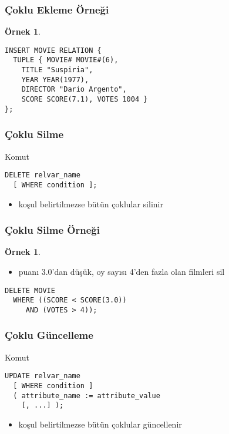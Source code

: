 \documentclass[dvipsnames]{beamer}
\theoremstyle{definition}
\theoremstyle{example}
\newtheorem{ornek}[theorem]{Örnek}
\theoremstyle{plain}
\begin{document}
\begin{frame}[fragile]
  \frametitle{Çoklu Ekleme Örneği}

  \begin{ornek}
    \begin{lstlisting}
INSERT MOVIE RELATION {
  TUPLE { MOVIE# MOVIE#(6),
    TITLE "Suspiria",
    YEAR YEAR(1977),
    DIRECTOR "Dario Argento",
    SCORE SCORE(7.1), VOTES 1004 }
};
    \end{lstlisting}
  \end{ornek}
\end{frame}

\begin{frame}[fragile]
  \frametitle{Çoklu Silme}

  \begin{block}{Komut}
    \begin{lstlisting}
DELETE relvar_name
  [ WHERE condition ];
    \end{lstlisting}
  \end{block}

  \pause
  \begin{itemize}
    \item koşul belirtilmezse bütün çoklular silinir
  \end{itemize}
\end{frame}

\begin{frame}[fragile]
  \frametitle{Çoklu Silme Örneği}

  \begin{ornek}
    \begin{itemize}
      \item puanı 3.0'dan düşük, oy sayısı 4'den fazla olan filmleri sil
    \end{itemize}

    \begin{lstlisting}
DELETE MOVIE
  WHERE ((SCORE < SCORE(3.0))
     AND (VOTES > 4));
    \end{lstlisting}
  \end{ornek}
\end{frame}

\begin{frame}[fragile]
  \frametitle{Çoklu Güncelleme}

  \begin{block}{Komut}
    \begin{lstlisting}
UPDATE relvar_name
  [ WHERE condition ]
  ( attribute_name := attribute_value
    [, ...] );
    \end{lstlisting}
  \end{block}

  \pause
  \begin{itemize}
    \item koşul belirtilmezse bütün çoklular güncellenir
  \end{itemize}
\end{frame}
\end{document}
